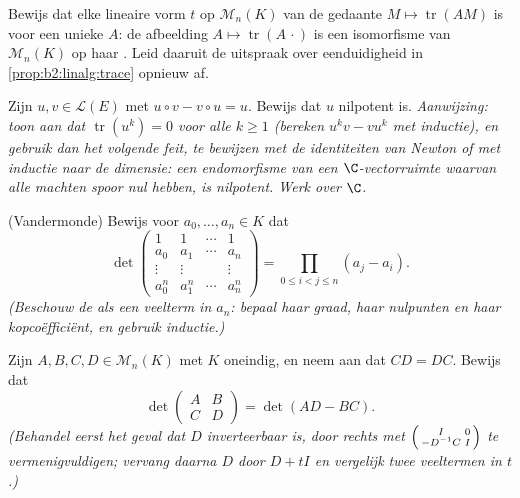 \begin{exercise}[$\star\star\star$]\label{exo:b2:linalg:9}
Bewijs dat elke lineaire vorm $t$ op $\mathcal{M}_n(K)$ van de
gedaante $M \mapsto \operatorname{tr}(AM)$ is voor een unieke $A$:
de afbeelding $A \mapsto \operatorname{tr}(A\,\cdot)$ is een
isomorfisme van $\mathcal{M}_n(K)$ op haar . Leid
daaruit de uitspraak over eenduidigheid in
\cref{prop:b2:linalg:trace} opnieuw af.
\end{exercise}

\begin{exercise}[$\star\star\star$]\label{exo:b2:linalg:10}
Zijn $u, v \in \mathcal{L}(E)$ met $u \circ v - v \circ u = u$.
Bewijs dat $u$ nilpotent is. \emph{Aanwijzing: toon aan dat
$\operatorname{tr}(u^k) = 0$ voor alle $k \geq 1$ (bereken $u^k v -
v u^k$ met inductie), en gebruik dan het volgende feit, te
bewijzen met de identiteiten van Newton of met inductie naar de
dimensie: een endomorfisme van een $\C$-vectorruimte waarvan alle
machten spoor nul hebben, is nilpotent. Werk over $\C$.}
\end{exercise}

\begin{exercise}[$\star\star$]\label{exo:b2:linalg:11}
(Vandermonde) Bewijs voor $a_0, \dots, a_n \in K$ dat
\[
\det\begin{pmatrix}
1 & 1 & \cdots & 1\\
a_0 & a_1 & \cdots & a_n\\
\vdots & \vdots & & \vdots\\
a_0^n & a_1^n & \cdots & a_n^n
\end{pmatrix}
= \prod_{0 \leq i < j \leq n} (a_j - a_i).
\]
\emph{(Beschouw de  als een veelterm in $a_n$: bepaal
haar graad, haar nulpunten en haar kopcoëfficiënt, en gebruik
inductie.)}
\end{exercise}

\begin{exercise}[$\star\star\star$]\label{exo:b2:linalg:12}
Zijn $A, B, C, D \in \mathcal{M}_n(K)$ met $K$ oneindig, en neem
aan dat $CD = DC$. Bewijs dat
\[
\det\begin{pmatrix} A & B\\ C & D\end{pmatrix}
= \det(AD - BC).
\]
\emph{(Behandel eerst het geval dat $D$ inverteerbaar is, door
rechts met $\begin{psmallmatrix} I & 0\\ -D^{-1}C &
I\end{psmallmatrix}$ te vermenigvuldigen; vervang daarna $D$ door
$D + tI$ en vergelijk twee veeltermen in $t$.)}
\end{exercise}

